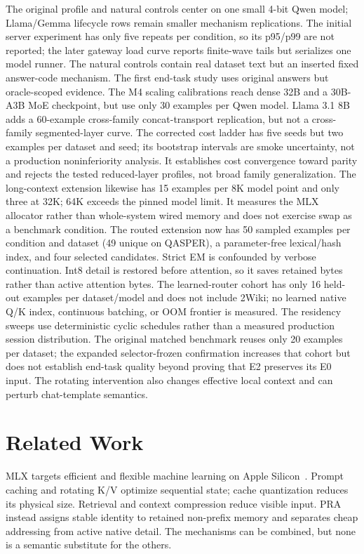 \documentclass[10pt]{article}
\begin{document}
The original profile and natural controls center on one small 4-bit Qwen model;
Llama/Gemma lifecycle rows remain smaller mechanism replications.
The initial server experiment has only five repeats per condition, so its
p95/p99 are not reported; the later gateway load curve reports finite-wave
tails but serializes one model runner. The natural controls contain real
dataset text but an inserted fixed answer-code mechanism.
The first end-task study uses original answers but oracle-scoped evidence. The
M4 scaling calibrations reach dense 32B and a 30B-A3B MoE checkpoint, but use
only 30 examples per Qwen model. Llama 3.1 8B adds a 60-example cross-family
concat-transport replication, but not a cross-family segmented-layer curve.
The corrected cost ladder has
five seeds but two examples per dataset and seed; its bootstrap intervals are
smoke uncertainty, not a production noninferiority analysis. It establishes
cost convergence toward parity and rejects the tested reduced-layer profiles,
not broad family generalization. The long-context extension likewise has 15 examples
per 8K model point and only three at 32K; 64K exceeds the pinned model limit.
It measures the MLX allocator rather than whole-system wired memory and does
not exercise swap as a benchmark condition. The
routed extension now has 50 sampled examples per condition and dataset (49
unique on QASPER), a parameter-free lexical/hash index, and four selected
candidates. Strict EM
is confounded by verbose continuation. Int8 detail is restored before
 attention, so it saves retained bytes rather than active attention bytes. The
 learned-router cohort has only 16 held-out examples per dataset/model and does
 not include 2Wiki; no learned native Q/K index, continuous batching, or OOM
 frontier is measured.
The residency sweeps use deterministic cyclic schedules rather than a measured
production session distribution. The original matched benchmark reuses only
20 examples per dataset; the expanded selector-frozen confirmation increases
that cohort but does
not establish end-task quality beyond proving that E2 preserves its E0 input.
The rotating intervention also changes effective local context and can perturb
chat-template semantics.

\section{Related Work}
MLX targets efficient and flexible machine learning on Apple
Silicon~\cite{hannun2023mlx}. Prompt caching and rotating K/V optimize
sequential state; cache quantization reduces its physical size. Retrieval and
context compression reduce visible input. PRA instead assigns stable identity
to retained non-prefix memory and separates cheap addressing from active native
detail. The mechanisms can be combined, but none is a semantic substitute for
the others.
\end{document}
